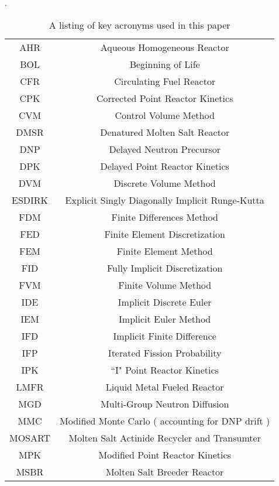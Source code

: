 \documentclass[review]{elsarticle}
\begin{document}
\begin{table}[h]
    \caption{A listing of key acronyms used in this paper}.
    \label{tbl:nomen}
    \begin{center}
        \begin{tabular}{|c c|}
            \hline
            AHR & Aqueous Homogeneous Reactor \\
            BOL & Beginning of Life \\
            CFR & Circulating Fuel Reactor \\
            CPK & Corrected Point Reactor Kinetics \\
            CVM & Control Volume Method \\
            DMSR & Denatured Molten Salt Reactor \\ 
            DNP & Delayed Neutron Precursor \\
            DPK & Delayed Point Reactor Kinetics \\
            DVM & Discrete Volume Method \\
            ESDIRK & Explicit Singly Diagonally Implicit Runge-Kutta \\
            FDM & Finite Differences Method \\
            FED & Finite Element Discretization \\
            FEM & Finite Element Method \\
            FID & Fully Implicit Discretization \\
            FVM & Finite Volume Method \\
            IDE & Implicit Discrete Euler \\
            IEM & Implicit Euler Method \\
            IFD & Implicit Finite Difference \\
            IFP & Iterated Fission Probability \\
            IPK & ``I" Point Reactor Kinetics \\
            LMFR & Liquid Metal Fueled Reactor \\
            MGD & Multi-Group Neutron Diffusion \\
            MMC & Modified Monte Carlo ( accounting for DNP drift ) \\
            MOSART & Molten Salt Actinide Recycler and Transumter \\
            MPK & Modified Point Reactor Kinetics \\
            MSBR & Molten Salt Breeder Reactor \\

\end{tabular}
\end{center}
\end{table}
\end{document}
